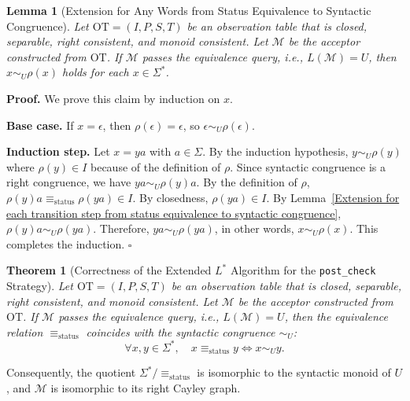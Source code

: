 \documentclass{ieice-tecrep}
\newtheorem{lemma}{Lemma}
\newtheorem{theorem}{Theorem}
\begin{document}
\begin{lemma}[Extension for Any Words from Status Equivalence to Syntactic Congruence]\label{Extension for any strings from status equivalence to syntactic congruence}
Let \(\mathrm{OT}=(I,P,S,T)\) be an observation table that
is closed, separable, right consistent, and monoid consistent. Let
\(\mathcal M\) be the acceptor constructed from \(\mathrm{OT}\). If
\(\mathcal M\) passes the equivalence query, i.e., \(L(\mathcal M)=U\), then
\(
x\sim_U\rho(x)
\) holds for each \(x\in\Sigma^*\).
\end{lemma}
\textbf{Proof.}
We prove this claim by induction on \(x\).

\noindent\textbf{Base case.} If \(x=\epsilon\), then \(\rho(\epsilon)=\epsilon\),
so \(\epsilon\sim_U\rho(\epsilon)\).

\noindent\textbf{Induction step.} Let \(x=ya\) with \(a\in\Sigma\).
By the induction hypothesis, \(y \sim_U \rho(y)\) where \(\rho(y) \in I\) because of the definition of \(\rho\).
Since syntactic congruence is a right congruence, we have \(ya\sim_U \rho(y)a\).
By the definition of \(\rho\), \(\rho(y)a\equiv_{\mathrm{status}}\rho(ya)\in I\). By closedness, \(\rho(ya)\in I\).
By Lemma~\ref{Extension for each transition step from status equivalence to syntactic congruence}, \(\rho(y)a \sim_U \rho(ya)\).
Therefore, \(ya \sim_U \rho(ya)\), in other words, \(x \sim_U \rho(x)\). This completes the induction.
\hfill $\square$

\begin{theorem}[Correctness of the Extended \(L^*\) Algorithm for the \texttt{post\_check} Strategy]\label{theorem-correctness-of-extended-lstar-algorithm-for-post-check-strategy}
Let \(\mathrm{OT}=(I,P,S,T)\) be an observation table that
is closed, separable, right consistent, and monoid consistent. Let
\(\mathcal M\) be the acceptor constructed from \(\mathrm{OT}\). If
\(\mathcal M\) passes the equivalence query, i.e., \(L(\mathcal M)=U\), then the equivalence relation \(\equiv_{\mathrm{status}}\) coincides
with the syntactic congruence \(\sim_U\): \[
\forall x,y\in\Sigma^*,\quad
x\equiv_{\mathrm{status}}y
\Longleftrightarrow
x\sim_U y.
\]
\end{theorem}
Consequently, the quotient \(\Sigma^*/{\equiv_{\mathrm{status}}}\) is isomorphic to the syntactic monoid of \(U\), and \(\mathcal M\) is
isomorphic to its right Cayley graph.
\end{document}
